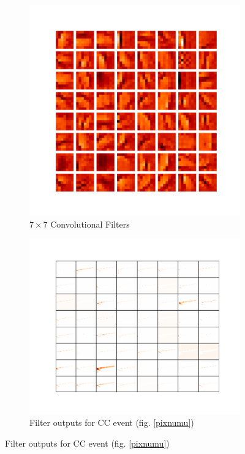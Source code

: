 \begin{figure}[t]
\begin{center}

\begin{subfigure}[b]{0.49\textwidth}
\includegraphics[width=\textwidth]{figures/cnn/conv1y.pdf}
\caption*{$7\times7$ Convolutional Filters}
\end{subfigure}
\begin{subfigure}[b]{0.49\textwidth}
\includegraphics[width=\textwidth]{figures/cnn/feat1_truetype2_caltype2_event274_y.pdf}
\caption*{Filter outputs for \numu CC event (fig. \ref{pixnumu})}
\end{subfigure}


\end{center}
\end{figure}
